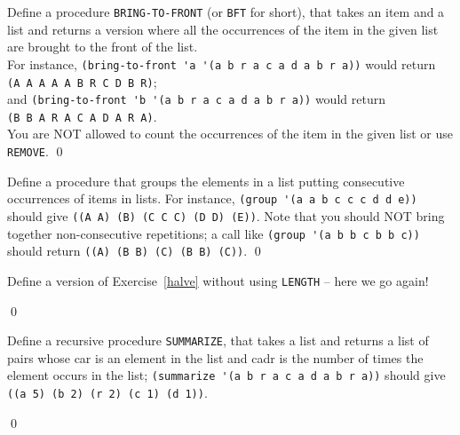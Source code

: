 \documentclass[a4paper,11pt]{article}
\begin{document}
\begin{uexercise}
Define a procedure \Verb+BRING-TO-FRONT+ (or \Verb+BFT+ for short), that takes an item and a list and returns a version where all the occurrences of the item in the given list are brought to the front of the list.\\ For instance, 
\Verb+(bring-to-front 'a '(a b r a c a d a b r a))+ would return\\ \Verb+(A A A A A B R C D B R)+;\\ and \Verb+(bring-to-front 'b '(a b r a c a d a b r a))+ would return \\ \Verb+(B B A R A C A D A R A)+.\\ You are NOT allowed to count the occurrences of the item in the given list or use \Verb+REMOVE+.
\qed
\end{uexercise}

\begin{uexercise}
Define a procedure that groups the elements in a list putting consecutive occurrences of items in lists. For instance, \Verb+(group '(a a b c c c d d e))+ should give \Verb+((A A) (B) (C C C) (D D) (E))+. Note that you should NOT bring together non-consecutive repetitions; a call like  \Verb+(group '(a b b c b b c))+ should return \Verb+((A) (B B) (C) (B B) (C))+.
\qed
\end{uexercise}


\begin{uexercise}
Define a version of Exercise~\ref{halve} without using \Verb+LENGTH+ -- here we go again!

\qed
\end{uexercise}

\begin{uexercise}[*]
Define a recursive procedure \Verb+SUMMARIZE+, that takes a list and returns a list of pairs whose car is an element in the list and cadr is the number of times the element occurs in the list; \Verb+(summarize '(a b r a c a d a b r a))+ should give \Verb+((a 5) (b 2) (r 2) (c 1) (d 1))+.

\qed
\end{uexercise}
\end{document}
